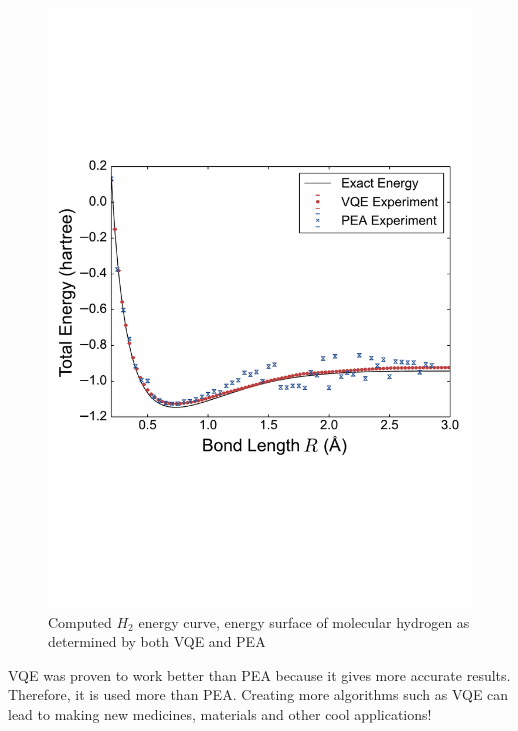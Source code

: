 \documentclass[14pt,landscape,color=UCLdarkred,margin=3cm]{uclposter}
\begin{document}
\begin{multicols}{3}
\begin{figure}[H]
  \begin{center}
  \includegraphics[scale=1.5]{result.pdf}
  \caption{Computed $H_2$ energy curve, energy surface of molecular hydrogen as determined by both VQE and PEA}
  \end{center}
    
 

   
\end{figure}

VQE was proven to work better than PEA because it gives more accurate results. Therefore, it is used more than PEA. Creating more algorithms such as VQE can lead to making new medicines, materials and other cool applications!


\end{multicols}
	
\end{document}
